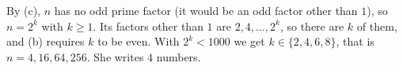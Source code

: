 By (c), $n$ has no odd prime factor (it would be an odd factor other than $1$), so $n=2^k$ with $k\ge1$. Its factors other than $1$ are $2,4,\dots,2^k$, so there are $k$ of them, and (b) requires $k$ to be even. With $2^k<1000$ we get $k\in\{2,4,6,8\}$, that is $n=4,16,64,256$. She writes $\boxed{4}$ numbers.
